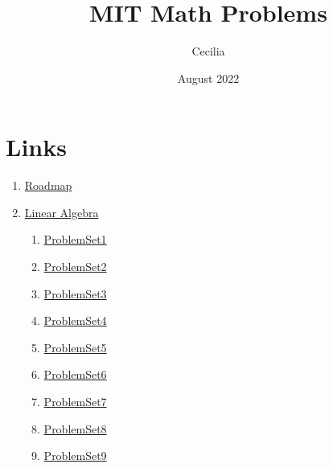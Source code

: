 \documentclass{article}
\title{MIT Math Problems}
\author{Cecilia}
\date{August 2022}
\begin{document}
\maketitle

\section*{Links}
    \begin{enumerate}
        \item \href{https://math.mit.edu/academics/undergrad/roadmaps.php}{Roadmap}
        \item \href{https://ocw.mit.edu/courses/18-700-linear-algebra-fall-2013/}{Linear Algebra}
        \begin{enumerate}
            \item \hyperlink{LinearAlgebra-ProblemSet1.1}{ProblemSet1}
            \item \hyperlink{LinearAlgebra-ProblemSet2.1}{ProblemSet2}
            \item \hyperlink{LinearAlgebra-ProblemSet3.1}{ProblemSet3}
            \item \hyperlink{LinearAlgebra-ProblemSet4.1}{ProblemSet4}
            \item \hyperlink{LinearAlgebra-ProblemSet5.1}{ProblemSet5}
            \item \hyperlink{LinearAlgebra-ProblemSet6.1}{ProblemSet6}
            \item \hyperlink{LinearAlgebra-ProblemSet7.1}{ProblemSet7}
            \item \hyperlink{LinearAlgebra-ProblemSet8.1}{ProblemSet8}
            \item \hyperlink{LinearAlgebra-ProblemSet9.1}{ProblemSet9}
        \end{enumerate}
    \end{enumerate}

%
%

















\end{document}
